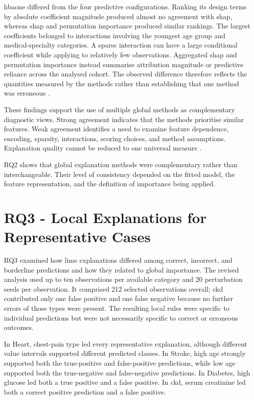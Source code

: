 \gls{hbaone} differed from the four predictive configurations. Ranking its design terms by absolute coefficient magnitude produced almost no agreement with \gls{shap}, whereas \gls{shap} and permutation importance produced similar rankings. The largest coefficients belonged to interactions involving the youngest age group and medical-specialty categories. A sparse interaction can have a large conditional coefficient while applying to relatively few observations. Aggregated \gls{shap} and permutation importance instead summarise attribution magnitude or predictive reliance across the analysed cohort. The observed difference therefore reflects the quantities measured by the methods rather than establishing that one method was erroneous \citep{fisher_models_2019, NIPS2017_8a20a862, linardatos_explainable_2020, vilone_classification_2021}.

These findings support the use of multiple global methods as complementary diagnostic views. Strong agreement indicates that the methods prioritise similar features. Weak agreement identifies a need to examine feature dependence, encoding, sparsity, interactions, scoring choices, and method assumptions. Explanation quality cannot be reduced to one universal measure \citep{mohseni_multidisciplinary_2021, lofstrom_meta_2022}.

RQ2 shows that global explanation methods were complementary rather than interchangeable. Their level of consistency depended on the fitted model, the feature representation, and the definition of importance being applied.

\section{RQ3 - Local Explanations for Representative Cases}

RQ3 examined how \gls{lime} explanations differed among correct, incorrect, and borderline predictions and how they related to global importance. The revised analysis used up to ten observations per available category and 20 perturbation seeds per observation. It comprised 212 selected observations overall; \gls{ckd} contributed only one false positive and one false negative because no further errors of those types were present. The resulting local rules were specific to individual predictions but were not necessarily specific to correct or erroneous outcomes.

In Heart, chest-pain type led every representative explanation, although different value intervals supported different predicted classes. In Stroke, high age strongly supported both the true-positive and false-positive predictions, while low age supported both the true-negative and false-negative predictions. In Diabetes, high glucose led both a true positive and a false positive. In \gls{ckd}, serum creatinine led both a correct positive prediction and a false positive.

